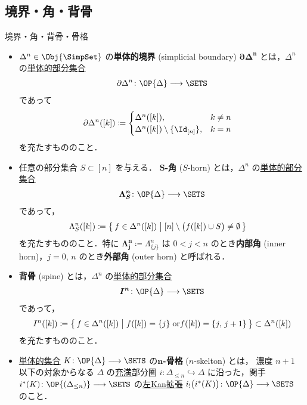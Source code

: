\documentclass[TQFT_main]{subfiles}
\begin{document}
\subsection{境界・角・背骨}

\begin{mydef}[label=def:horn,breakable]{境界・角・背骨・骨格}
    \begin{itemize}
        \item $\Delta^n \in \Obj{\SimpSet}$ の\textbf{単体的境界} (simplicial boundary) $\bm{\partial \Delta^n}$ とは，$\Delta^n$ の\hyperref[def:SimpSet]{単体的部分集合}
        \begin{align}
            \partial \Delta^n \colon \OP{\Delta} \lto \SETS
        \end{align}
        であって 
        \begin{align}
            \partial \Delta^n ([k]) &\coloneqq 
            \begin{cases}
                \Delta^n ([k]), &k \neq n \\
                \Delta^n ([k]) \setminus \{\Id_{[n]}\}, &k=n
            \end{cases}
        \end{align}
        を充たすもののこと．
        
        \item 任意の部分集合 $S \subset [n]$ を与える．
        \textbf{$\bm{S}$-角} ($S$-horn) とは，$\Delta^n$ の\hyperref[def:SimpSet]{単体的部分集合}
        \begin{align}
            \bm{\Lambda^n_S} \colon \OP{\Delta} \lto \SETS
        \end{align}
        であって，
        \begin{align}
            \Lambda^n_S ([k]) &\coloneqq \bigl\{\, f \in \Delta^n([k]) \bigm| [n] \setminus \bigl(f([k]) \cup S \bigr) \neq \emptyset  \,\bigr\}
        \end{align}
        を充たすもののこと．特に $\bm{\Lambda^n_j} \coloneqq \Lambda^n_{\{j\}}$ は $0 < j < n$ のとき\textbf{内部角} (inner horn)，$j = 0,\, n$ のとき\textbf{外部角} (outer horn) と呼ばれる．

        \item \textbf{背骨} (spine) とは，$\Delta^n$ の\hyperref[def:SimpSet]{単体的部分集合}
        \begin{align}
            \bm{I^n} \colon \OP{\Delta} \lto \SETS
        \end{align}
        であって，
        \begin{align}
            I^n ([k]) \coloneqq \bigl\{\, f \in \Delta^n([k]) \bigm| f([k]) = \{j\}\; \mathrm{or} f([k]) = \{j,\, j+1\} \,\bigr\} \subset \Delta^n([k])
        \end{align}
        を充たすもののこと．
        \item \hyperref[def:SimpSet]{単体的集合} $K \colon \OP{\Delta} \lto \SETS$ の\textbf{$\bm{n}$-骨格} ($n$-skelton) とは，
        濃度 $n+1$ 以下の対象からなる $\Delta$ の\hyperref[def:faithful]{充満}部分圏 $i \colon \Delta_{\le n} \hookrightarrow \Delta$ に沿った，関手 $i^*(K) \colon \OP{(\Delta_{\le n})} \lto \SETS$ の\hyperref[def:Kanext]{左Kan拡張} $i_! \bigl(i^* (K)\bigr) \colon \OP{\Delta} \lto \SETS$ のこと．


\end{itemize}
\end{mydef}
\end{document}
